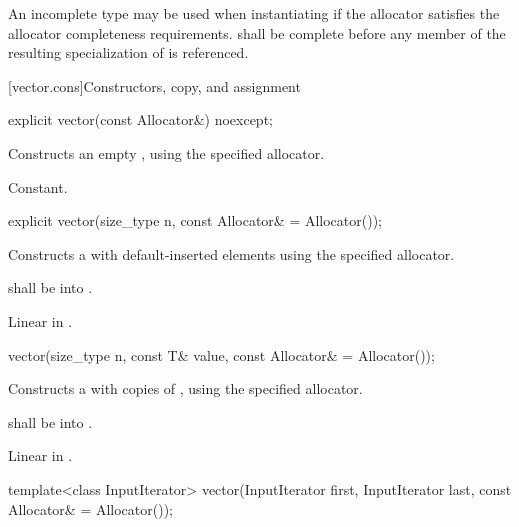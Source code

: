 \pnum
An incomplete type  may be used when instantiating 
if the allocator satisfies the
allocator completeness requirements.
 shall be complete before any member of the resulting specialization
of  is referenced.

[vector.cons]{Constructors, copy, and assignment}

\begin{itemdecl}
explicit vector(const Allocator&) noexcept;
\end{itemdecl}

\begin{itemdescr}
\pnum
\effects Constructs an empty , using the
specified allocator.

\pnum
\complexity Constant.
\end{itemdescr}

\begin{itemdecl}
explicit vector(size_type n, const Allocator& = Allocator());
\end{itemdecl}

\begin{itemdescr}
\pnum
\effects Constructs a  with 
default-inserted elements using the specified allocator.

\pnum
\requires {} shall be  into .

\pnum
\complexity Linear in .
\end{itemdescr}

\begin{itemdecl}
vector(size_type n, const T& value,
       const Allocator& = Allocator());
\end{itemdecl}

\begin{itemdescr}
\pnum
\effects Constructs a  with 
copies of , using the specified allocator.

\pnum
\requires {} shall be
 into .

\pnum
\complexity Linear in .
\end{itemdescr}

\begin{itemdecl}
template<class InputIterator>
  vector(InputIterator first, InputIterator last,
         const Allocator& = Allocator());
\end{itemdecl}

